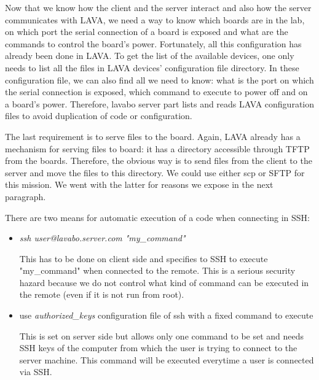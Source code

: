 Now that we know how the client and the server interact and also how the server communicates with LAVA, we need a way to know which boards are in the lab, on which port the serial connection of a board is exposed and what are the commands to control the board's power. Fortunately, all this configuration has already been done in LAVA. To get the list of the available devices, one only needs to list all the files in LAVA devices' configuration file directory. In these configuration file, we can also find all we need to know: what is the port on which the serial connection is exposed, which command to execute to power off and on a board's power. Therefore, lavabo server part lists and reads LAVA configuration files to avoid duplication of code or configuration.

The last requirement is to serve files to the board. Again, LAVA already has a mechanism for serving files to board: it has a directory accessible through TFTP from the boards. Therefore, the obvious way is to send files from the client to the server and move the files to this directory. We could use either scp or SFTP for this mission. We went with the latter for reasons we expose in the next paragraph.

There are two means for automatic execution of a code when connecting in SSH:
\begin{itemize}
  \item \textit{ssh user@lavabo.server.com "my\_command"}

This has to be done on client side and specifies to SSH to execute "my\_command" when connected to the remote. This is a serious security hazard because we do not control what kind of command can be executed in the remote (even if it is not run from root).

  \item use \textit{authorized\_keys} configuration file of ssh with a fixed command to execute

This is set on server side but allows only one command to be set and needs SSH keys of the computer from which the user is trying to connect to the server machine. This command will be executed everytime a user is connected via SSH.
\end{itemize}


